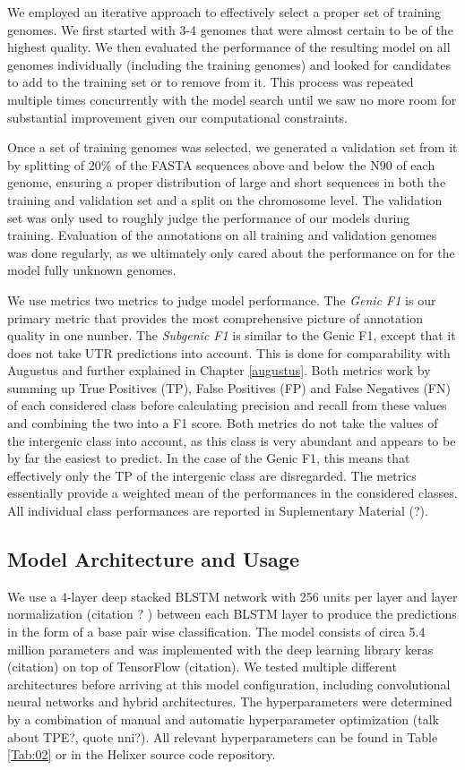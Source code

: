 \documentclass{bioinfo}
\begin{document}
\begin{methods}
We employed an iterative approach to effectively select a proper set of training genomes. We first started with 3-4 genomes that were almost certain to be of the highest quality. We then evaluated the performance of the resulting model on all genomes individually (including the training genomes) and looked for candidates to add to the training set or to remove from it. This process was repeated multiple times concurrently with the model search until we saw no more room for substantial improvement given our computational constraints.

Once a set of training genomes was selected, we generated a validation set from it by splitting of 20\% of the FASTA sequences above and below the N90 of each genome, ensuring a proper distribution of large and short sequences in both the training and validation set and a split on the chromosome level. The validation set was only used to roughly judge the performance of our models during training. Evaluation of the annotations on all training and validation genomes was done regularly, as we ultimately only cared about the performance on for the model fully unknown genomes. 

We use metrics two metrics to judge model performance. The {\it Genic F1} is our primary metric that provides the most comprehensive picture of annotation quality in one number. The {\it Subgenic F1} is similar to the Genic F1, except that it does not take UTR predictions into account. This is done for comparability with Augustus and further explained in Chapter \ref{augustus}. Both metrics work by summing up True Positives (TP), False Positives (FP) and False Negatives (FN) of each considered class before calculating precision and recall from these values and combining the two into a F1 score. Both metrics do not take the values of the intergenic class into account, as this class is very abundant and appears to be by far the easiest to predict. In the case of the Genic F1, this means that effectively only the TP of the intergenic class are disregarded. The metrics essentially provide a weighted mean of the performances in the considered classes. All individual class performances are reported in Suplementary Material (?). 
	
\subsection{Model Architecture and Usage}
We use a 4-layer deep stacked BLSTM network with 256 units per layer and layer normalization (citation ? ) between each BLSTM layer to produce the predictions in the form of a base pair wise classification. The model consists of circa 5.4 million parameters and was implemented with the deep learning library keras (citation) on top of TensorFlow (citation). We tested multiple different architectures before arriving at this model configuration, including convolutional neural networks and hybrid architectures. The hyperparameters were determined by a combination of manual and automatic hyperparameter optimization (talk about TPE?, quote nni?). All relevant hyperparameters can be found in Table \ref{Tab:02} or in the Helixer source code repository. 
	

\end{methods}
\end{document}
